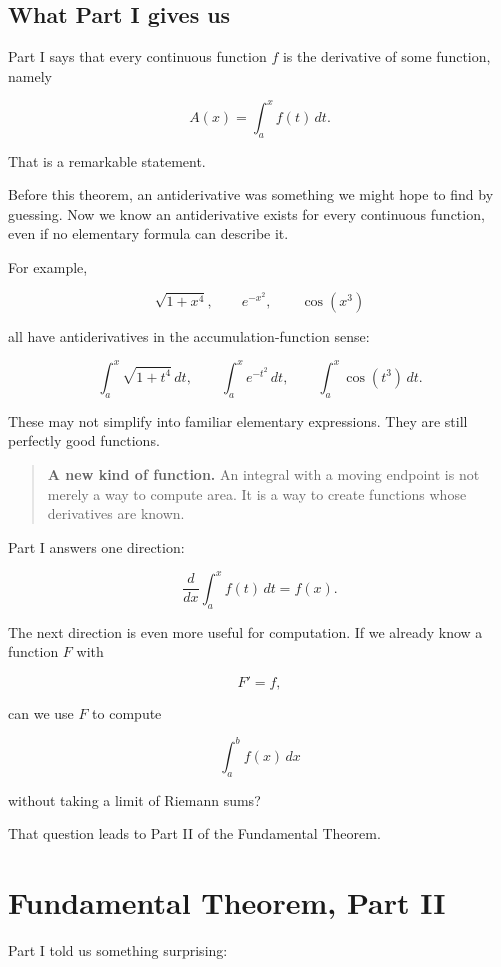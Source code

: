 \subsection{What Part I gives us}
\label{subsec:what-ftc1-gives-us}

Part I says that every continuous function \(f\) is the derivative of some function, namely

\[
A(x)=\int_a^x f(t)\,dt.
\]

That is a remarkable statement.

Before this theorem, an antiderivative was something we might hope to find by guessing.
Now we know an antiderivative exists for every continuous function, even if no elementary
formula can describe it.

For example,

\[
\sqrt{1+x^4},
\qquad
e^{-x^2},
\qquad
\cos(x^3)
\]

all have antiderivatives in the accumulation-function sense:

\[
\int_a^x \sqrt{1+t^4}\,dt,
\qquad
\int_a^x e^{-t^2}\,dt,
\qquad
\int_a^x \cos(t^3)\,dt.
\]

These may not simplify into familiar elementary expressions.  They are still perfectly good
functions.

\begin{quote}
\textbf{A new kind of function.}
An integral with a moving endpoint is not merely a way to compute area.  It is a way to
create functions whose derivatives are known.
\end{quote}

Part I answers one direction:

\[
\frac{d}{dx}\int_a^x f(t)\,dt=f(x).
\]

The next direction is even more useful for computation.  If we already know a function
\(F\) with

\[
F'=f,
\]

can we use \(F\) to compute

\[
\int_a^b f(x)\,dx
\]

without taking a limit of Riemann sums?

That question leads to Part II of the Fundamental Theorem.
\section{Fundamental Theorem, Part II}
\label{sec:fundamental-theorem-part-ii}

Part I told us something surprising:

